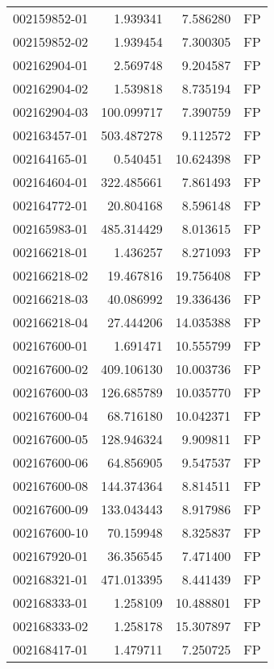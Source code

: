 \begin{tabular}{lrrl}
002159852-01 &    1.939341 &       7.586280 &   FP \\
002159852-02 &    1.939454 &       7.300305 &   FP \\
002162904-01 &    2.569748 &       9.204587 &   FP \\
002162904-02 &    1.539818 &       8.735194 &   FP \\
002162904-03 &  100.099717 &       7.390759 &   FP \\
002163457-01 &  503.487278 &       9.112572 &   FP \\
002164165-01 &    0.540451 &      10.624398 &   FP \\
002164604-01 &  322.485661 &       7.861493 &   FP \\
002164772-01 &   20.804168 &       8.596148 &   FP \\
002165983-01 &  485.314429 &       8.013615 &   FP \\
002166218-01 &    1.436257 &       8.271093 &   FP \\
002166218-02 &   19.467816 &      19.756408 &   FP \\
002166218-03 &   40.086992 &      19.336436 &   FP \\
002166218-04 &   27.444206 &      14.035388 &   FP \\
002167600-01 &    1.691471 &      10.555799 &   FP \\
002167600-02 &  409.106130 &      10.003736 &   FP \\
002167600-03 &  126.685789 &      10.035770 &   FP \\
002167600-04 &   68.716180 &      10.042371 &   FP \\
002167600-05 &  128.946324 &       9.909811 &   FP \\
002167600-06 &   64.856905 &       9.547537 &   FP \\
002167600-08 &  144.374364 &       8.814511 &   FP \\
002167600-09 &  133.043443 &       8.917986 &   FP \\
002167600-10 &   70.159948 &       8.325837 &   FP \\
002167920-01 &   36.356545 &       7.471400 &   FP \\
002168321-01 &  471.013395 &       8.441439 &   FP \\
002168333-01 &    1.258109 &      10.488801 &   FP \\
002168333-02 &    1.258178 &      15.307897 &   FP \\
002168417-01 &    1.479711 &       7.250725 &   FP \\

\end{tabular}
